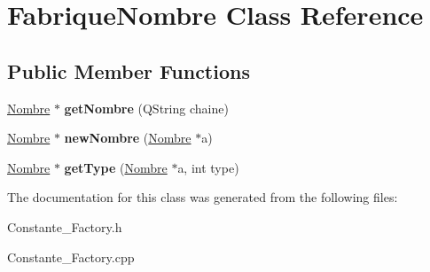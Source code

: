 \hypertarget{class_fabrique_nombre}{\section{Fabrique\-Nombre Class Reference}
\label{class_fabrique_nombre}
}
\subsection*{Public Member Functions}
\begin{DoxyCompactItemize}
\item 
\hypertarget{class_fabrique_nombre_addd29295516c6899e5f7901595fdeddc}{\hyperlink{class_calcul_1_1_nombre}{Nombre} $\ast$ {\bfseries get\-Nombre} (Q\-String chaine)}\label{class_fabrique_nombre_addd29295516c6899e5f7901595fdeddc}

\item 
\hypertarget{class_fabrique_nombre_ab2284f484135ef2bc05f9d83fc37a76f}{\hyperlink{class_calcul_1_1_nombre}{Nombre} $\ast$ {\bfseries new\-Nombre} (\hyperlink{class_calcul_1_1_nombre}{Nombre} $\ast$a)}\label{class_fabrique_nombre_ab2284f484135ef2bc05f9d83fc37a76f}

\item 
\hypertarget{class_fabrique_nombre_a499d63c9f3da120b74a6b4a830f61aff}{\hyperlink{class_calcul_1_1_nombre}{Nombre} $\ast$ {\bfseries get\-Type} (\hyperlink{class_calcul_1_1_nombre}{Nombre} $\ast$a, int type)}\label{class_fabrique_nombre_a499d63c9f3da120b74a6b4a830f61aff}

\end{DoxyCompactItemize}


The documentation for this class was generated from the following files\-:\begin{DoxyCompactItemize}
\item 
Constante\-\_\-\-Factory.\-h\item 
Constante\-\_\-\-Factory.\-cpp\end{DoxyCompactItemize}

